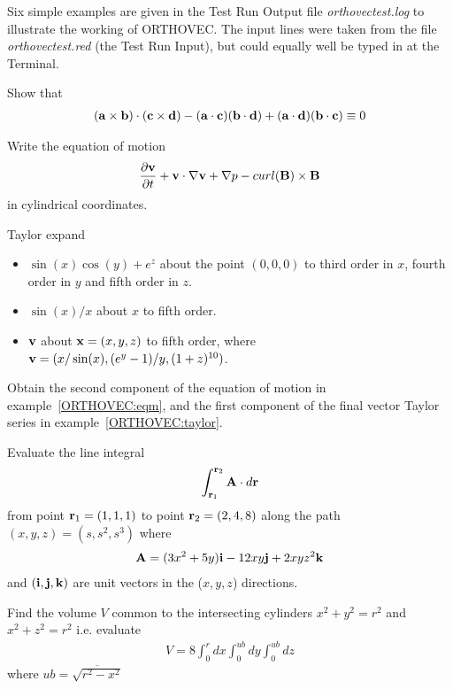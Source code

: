 Six  simple examples are given in the Test Run Output file 
{\em orthovectest.log} to illustrate the working of ORTHOVEC.  
The input lines were taken from the file
{\em orthovectest.red} (the Test Run Input), but could 
equally well be typed in at the Terminal.

\example{}

Show that
\begin{eqnarray*}
({\bf a}  \times {\bf b}) \cdot ({\bf c} \times {\bf d}) - ({\bf a} 
\cdot {\bf c})({\bf b} \cdot {\bf d})
 + ({\bf a} \cdot {\bf d})({\bf b} \cdot {\bf c}) \equiv 0
\end{eqnarray*}
 
\example{}\label{ORTHOVEC:eqm}

Write the equation of motion
\begin{eqnarray*}
\frac{\partial {\bf v}}{\partial t} + {\bf v} \cdot {\bf \nabla v} 
+ {\bf \nabla} p - curl ({\bf B}) \times {\bf B}
\end{eqnarray*}
in cylindrical coordinates.

\example{}\label{ORTHOVEC:taylor}

Taylor expand
\begin{itemize}
\item $\sin(x) \cos(y) +e^z$
about the point $(0,0,0)$ to third order in $x$, fourth order in $y$ and
fifth order in $z$.

\item $\sin(x)/x$ about $x$ to fifth order.

\item ${\bf v}$ about ${\bf x}=(x,y,z)$ to fifth order, where
${\bf v} = (x/ \sin(x),(e^y-1)/y,(1+z)^{10})$.
\end{itemize}

\example{}

Obtain the second component of the equation of motion in
example~\ref{ORTHOVEC:eqm}, and the first component of the final
vector Taylor series in example~\ref{ORTHOVEC:taylor}.

\example{}

Evaluate the line integral 
\begin{eqnarray*}
\int^{{\bf r}_2}_{{\bf r}_1} {\bf A} \cdot d{\bf r}
\end{eqnarray*}
from point ${\bf r}_1 = (1,1,1)$ to point
${\bf r}_2 = (2,4,8)$ along the path $(x,y,z) = (s, s^2, s^3)$ where\\
\begin{eqnarray*}
{\bf A} = (3x^2 + 5y) {\bf i} - 12xy{\bf j} + 2xyz^2{\bf k}
\end{eqnarray*}
and $({\bf i, j, k})$ are unit vectors in the ($x,y,z$) directions.

\example{}

Find the volume $V$ common to the intersecting cylinders $x^2 + y^2 
= r^2$ and $x^2 + z^2 = r^2$ i.e. evaluate
\begin{eqnarray*}
V = 8 \int^r_0 dx \int^{ub}_0 dy \int^{ub}_0 dz
\end{eqnarray*}
where $ub = \overline{\sqrt { r^2 - x^2}}$


